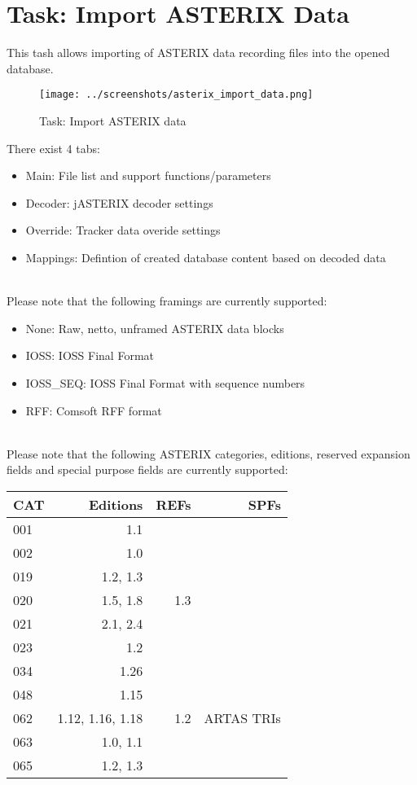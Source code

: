 \section{Task: Import ASTERIX Data}
\label{sec:task_import_asterix}

This tash allows importing of ASTERIX data recording files into the opened database. \\

\begin{figure}[H]
  \hspace*{-2.5cm}
    \texttt{[image: ../screenshots/asterix\_import\_data.png]}
  \caption{Task: Import ASTERIX data}
\end{figure}

There exist 4 tabs:

\begin{itemize}  
\item Main: File list and support functions/parameters
\item Decoder: jASTERIX decoder settings
\item Override: Tracker data overide settings
\item Mappings: Defintion of created database content based on decoded data
\end{itemize}
\ \\

Please note that the following framings are currently supported:
\begin{itemize}  
\item None: Raw, netto, unframed ASTERIX data blocks
\item IOSS: IOSS Final Format
\item IOSS\_SEQ: IOSS Final Format with sequence numbers
\item RFF: Comsoft RFF format
\end{itemize}
\ \\

Please note that the following ASTERIX categories, editions, reserved expansion fields and special purpose fields are currently supported: \\

\begin{tabular}{ | l | r | r | r |}
\hline
  CAT & Editions & REFs & SPFs  \\ \hline
  001 & 1.1 &  &  \\ \hline
  002 & 1.0 &  &  \\ \hline
  019 & 1.2, 1.3 & & \\ \hline
  020 & 1.5, 1.8 & 1.3 & \\ \hline
  021 & 2.1, 2.4 & & \\ \hline
  023 & 1.2 & & \\ \hline
  034 & 1.26 & & \\ \hline
  048 & 1.15 & & \\ \hline
  062 & 1.12, 1.16, 1.18 & 1.2 & ARTAS TRIs \\ \hline
  063 & 1.0, 1.1 & & \\ \hline
  065 & 1.2, 1.3 & & \\ \hline
\end{tabular} \\
\  \\

